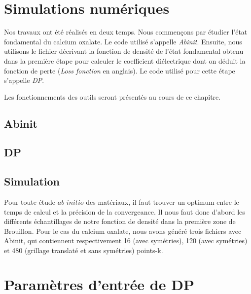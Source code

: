 \documentclass[12pt]{report}
\theoremstyle{theoreme}
\begin{document}
\chapter{Simulations numériques}
Nos travaux ont été réalisés en deux temps. Nous commençons par étudier l'état fondamental du calcium oxalate. Le code utilisé s'appelle \textit{Abinit}. Ensuite, nous utilisons le fichier décrivant la fonction de densité de l'état fondamental obtenu dans la première étape pour calculer le coefficient diélectrique dont on déduit la fonction de perte (\textit{Loss fonction} en anglais). Le code utilisé pour cette étape s'appelle \textit{DP}. 

Les fonctionnements des outils seront présentés au cours de ce chapitre.

\section{Abinit}

\section{DP}  

\section{Simulation}

Pour toute étude $\textit{ab initio }$des matériaux, il faut trouver un optimum entre le temps de calcul et la précision de la convergeance. Il nous faut donc d'abord les différents échantillages de notre fonction de densité dans la première zone de Brouillon. Pour le cas du calcium oxalate, nous avons généré trois fichiers avec Abinit, qui contiennent respectivement 16 (avec symétries), 120 (avec symétries) et 480 (grillage translaté et sans symétries) points-k.





\appendix
\chapter{Paramètres d'entrée de DP}
\end{document}
